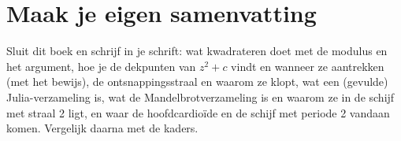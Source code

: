 
\ifzelfstudie
\section*{Maak je eigen samenvatting}
Sluit dit boek en schrijf in je schrift: wat kwadrateren doet met de modulus en het argument, hoe je de dekpunten van $z^2 + c$ vindt en wanneer ze aantrekken (met het bewijs), de ontsnappingsstraal en waarom ze klopt, wat een (gevulde) Julia-verzameling is, wat de Mandelbrotverzameling is en waarom ze in de schijf met straal 2 ligt, en waar de hoofdcardioïde en de schijf met periode 2 vandaan komen. Vergelijk daarna met de kaders.
\fi
